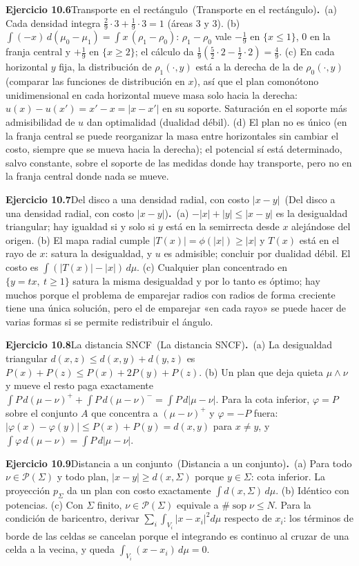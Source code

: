 \documentclass[11pt,a4paper]{amsart}
\def\sop{\operatorname {\mathrm{sop}}}
\theoremstyle{remark}
\theoremstyle{definition}
\numberwithin{subsection}{section}
\numberwithin{equation}{section}
\newcommand{\ejlabel}[2]{\par\medskip\noindent\textbf{Ejercicio #1}\ifx\relax#2\relax\else\ (#2)\fi\textbf{.}\ }
\begin{document}
\ejlabel{10.6}{Transporte en el rectángulo}(a) Cada densidad integra $\frac29\cdot3+\frac19\cdot3=1$ (áreas $3$ y $3$). (b) $\int(-x)\,d(\mu_0-\mu_1)=\int x\,(\rho_1-\rho_0)$: $\rho_1-\rho_0$ vale $-\frac19$ en $\{x\le1\}$, $0$ en la franja central y $+\frac19$ en $\{x\ge2\}$; el cálculo da $\frac19(\frac52\cdot2-\frac12\cdot2)=\frac49$. (c) En cada horizontal $y$ fija, la distribución de $\rho_1(\cdot,y)$ está a la derecha de la de $\rho_0(\cdot,y)$ (comparar las funciones de distribución en $x$), así que el plan comonótono unidimensional en cada horizontal mueve masa solo hacia la derecha: $u(x)-u(x')=x'-x=|x-x'|$ en su soporte. Saturación en el soporte más admisibilidad de $u$ dan optimalidad (dualidad débil). (d) El plan no es único (en la franja central se puede reorganizar la masa entre horizontales sin cambiar el costo, siempre que se mueva hacia la derecha); el potencial sí está determinado, salvo constante, sobre el soporte de las medidas donde hay transporte, pero no en la franja central donde nada se mueve.

\ejlabel{10.7}{Del disco a una densidad radial, con costo $|x-y|$}(a) $-|x|+|y|\le|x-y|$ es la desigualdad triangular; hay igualdad si y solo si $y$ está en la semirrecta desde $x$ alejándose del origen. (b) El mapa radial cumple $|T(x)|=\phi(|x|)\ge|x|$ y $T(x)$ está en el rayo de $x$: satura la desigualdad, y $u$ es admisible; concluir por dualidad débil. El costo es $\int(|T(x)|-|x|)\,d\mu$. (c) Cualquier plan concentrado en $\{y=tx,\ t\ge1\}$ satura la misma desigualdad y por lo tanto es óptimo; hay muchos porque el problema de emparejar radios con radios de forma creciente tiene una única solución, pero el de emparejar «en cada rayo» se puede hacer de varias formas si se permite redistribuir el ángulo.

\ejlabel{10.8}{La distancia SNCF}(a) La desigualdad triangular $d(x,z)\le d(x,y)+d(y,z)$ es $P(x)+P(z)\le P(x)+2P(y)+P(z)$. (b) Un plan que deja quieta $\mu\wedge\nu$ y mueve el resto paga exactamente $\int P\,d(\mu-\nu)^++\int P\,d(\mu-\nu)^-=\int P\,d|\mu-\nu|$. Para la cota inferior, $\varphi=P$ sobre el conjunto $A$ que concentra a $(\mu-\nu)^+$ y $\varphi=-P$ fuera: $|\varphi(x)-\varphi(y)|\le P(x)+P(y)=d(x,y)$ para $x\ne y$, y $\int\varphi\,d(\mu-\nu)=\int P\,d|\mu-\nu|$.

\ejlabel{10.9}{Distancia a un conjunto}(a) Para todo $\nu\in\mathcal P(\Sigma)$ y todo plan, $|x-y|\ge d(x,\Sigma)$ porque $y\in\Sigma$: cota inferior. La proyección $p_\Sigma$ da un plan con costo exactamente $\int d(x,\Sigma)\,d\mu$. (b) Idéntico con potencias. (c) Con $\Sigma$ finito, $\nu\in\mathcal P(\Sigma)$ equivale a $\#\sop\nu\le N$. Para la condición de baricentro, derivar $\sum_i\int_{V_i}|x-x_i|^2d\mu$ respecto de $x_i$: los términos de borde de las celdas se cancelan porque el integrando es continuo al cruzar de una celda a la vecina, y queda $\int_{V_i}(x-x_i)\,d\mu=0$.
\end{document}
